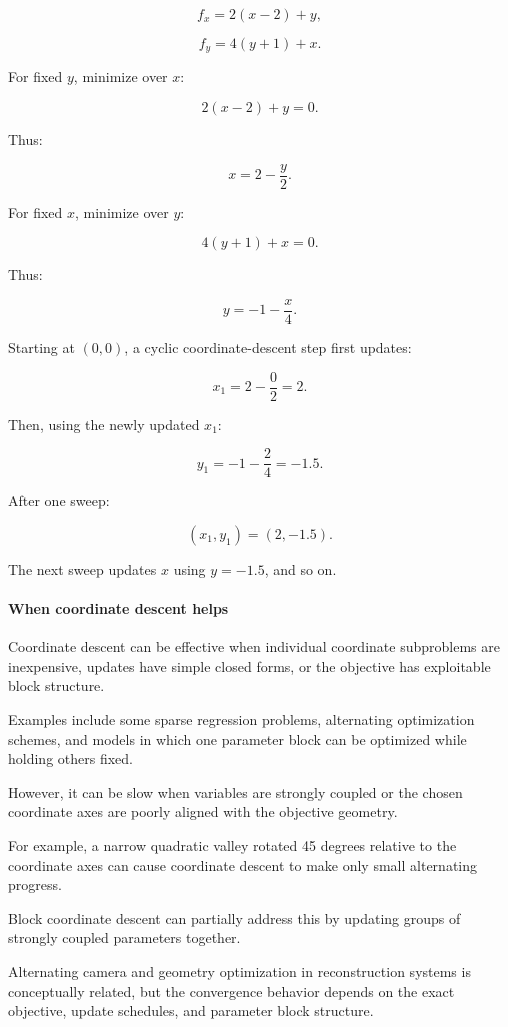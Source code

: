\[
f_x=2(x-2)+y,
\]

\[
f_y=4(y+1)+x.
\]

For fixed \(y\), minimize over \(x\):

\[
2(x-2)+y=0.
\]

Thus:

\[
\boxed{x=2-\frac y2}.
\]

For fixed \(x\), minimize over \(y\):

\[
4(y+1)+x=0.
\]

Thus:

\[
\boxed{y=-1-\frac x4}.
\]

Starting at \((0,0)\), a cyclic coordinate-descent step first updates:

\[
x_1=2-\frac02=2.
\]

Then, using the newly updated \(x_1\):

\[
y_1=-1-\frac24=-1.5.
\]

After one sweep:

\[
\boxed{(x_1,y_1)=(2,-1.5)}.
\]

The next sweep updates \(x\) using \(y=-1.5\), and so on.

\paragraph{When coordinate descent helps}\label{02-foundations-ii-ch027-when-coordinate-descent-helps}

Coordinate descent can be effective when individual coordinate subproblems are inexpensive, updates have simple closed forms, or the objective has exploitable block structure.

Examples include some sparse regression problems, alternating optimization schemes, and models in which one parameter block can be optimized while holding others fixed.

However, it can be slow when variables are strongly coupled or the chosen coordinate axes are poorly aligned with the objective geometry.

For example, a narrow quadratic valley rotated 45 degrees relative to the coordinate axes can cause coordinate descent to make only small alternating progress.

Block coordinate descent can partially address this by updating groups of strongly coupled parameters together.

Alternating camera and geometry optimization in reconstruction systems is conceptually related, but the convergence behavior depends on the exact objective, update schedules, and parameter block structure.

